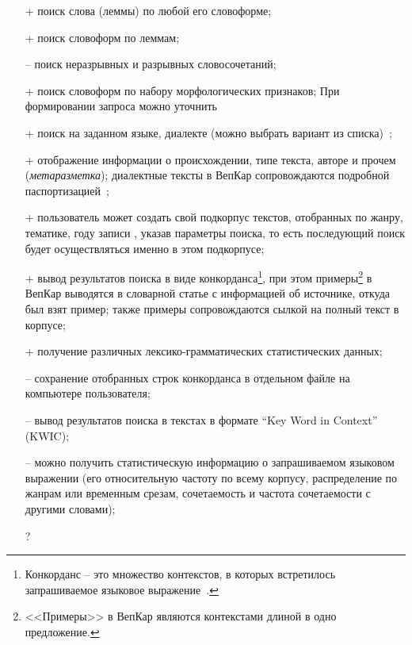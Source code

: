 \begin{itemize}
    \item[+] поиск слова (леммы) по любой его словоформе;
    \item[+] поиск словоформ по леммам;
    \item[--] поиск неразрывных и разрывных словосочетаний;
    \item[+] поиск словоформ по набору морфологических признаков;
При формировании запроса можно уточнить 
    \item[+] поиск на заданном языке, диалекте (можно выбрать вариант из списка)~\cite{KrizhanovskyCorpora2019Dialects};
    \item[+] отображение информации о происхождении, типе текста, авторе и прочем (\emph{метаразметка}); 
        диалектные тексты в ВепКар сопровождаются подробной паспортизацией~\cite{Krizhanovsky2019Architecture};
    \item[+] пользователь может создать свой подкорпус текстов, 
        отобранных по жанру, тематике, году записи , 
        указав параметры поиска, 
        то есть последующий поиск будет осуществляться именно в этом подкорпусе;
    
    \item[+] вывод результатов поиска в виде конкорданса\footnote{
            Конкорданс -- это множество контекстов, 
            в которых встретилось запрашиваемое языковое выражение~\cite[с.~415]{Kibrik2019}.
        }, при этом примеры\footnote{<<Примеры>> 
                                        в ВепКар являются контекстами 
                                        длиной в одно предложение.} 
                в ВепКар выводятся в словарной статье с информацией об источнике, откуда был взят пример; 
                также примеры сопровождаются сылкой на полный текст в корпусе;
    \item[+] получение различных лексико-грамматических статистических данных;
    \item[--] сохранение отобранных строк конкорданса в отдельном файле на компьютере пользователя;
    \item[--] вывод результатов поиска в текстах в формате ``Key Word in Context'' (KWIC);
    \item[--] можно получить статистическую информацию 
        о запрашиваемом языковом выражении (его относительную частоту по всему корпусу,
        распределение по жанрам или временным срезам, сочетаемость и частота сочетаемости с другими словами);
        
    \item[?] 
\end{itemize}
